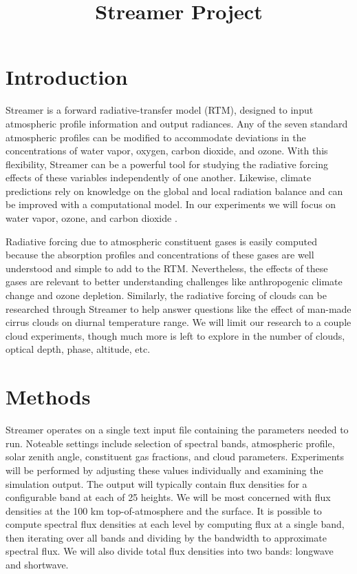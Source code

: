 \documentclass[twocol]{ametsoc}
\title{Streamer Project}
\affiliation{}
\begin{document}
\maketitle


%

\section{Introduction}
Streamer is a forward radiative-transfer model (RTM), designed to input atmospheric profile information and output radiances. Any of the seven standard atmospheric profiles can be modified to accommodate deviations in the concentrations of water vapor, oxygen, carbon dioxide, and ozone. With this flexibility, Streamer can be a powerful tool for studying the radiative forcing effects of these variables independently of one another. Likewise, climate predictions rely on knowledge on the global and local radiation balance and can be improved with a computational model. In our experiments we will focus on water vapor, ozone, and carbon dioxide \citep{Key:1998}.

Radiative forcing due to atmospheric constituent gases is easily computed because the absorption profiles and concentrations of these gases are well understood and simple to add to the RTM. Nevertheless, the effects of these gases are relevant to better understanding challenges like anthropogenic climate change and ozone depletion. Similarly, the radiative forcing of clouds can be researched through Streamer to help answer questions like the effect of man-made cirrus clouds on diurnal temperature range. We will limit our research to a couple cloud experiments, though much more is left to explore in the number of clouds, optical depth, phase, altitude, etc.
\section{Methods}
Streamer operates on a single text input file containing the parameters needed to run. Noteable settings include selection of spectral bands, atmospheric profile, solar zenith angle, constituent gas fractions, and cloud parameters. Experiments will be performed by adjusting these values individually and examining the simulation output. The output will typically contain flux densities for a configurable band at each of 25 heights. We will be most concerned with flux densities at the 100 km top-of-atmosphere and the surface. It is possible to compute spectral flux densities at each level by computing flux at a single band, then iterating over all bands and dividing by the bandwidth to approximate spectral flux. We will also divide total flux densities into two bands: longwave and shortwave. 
\end{document}
